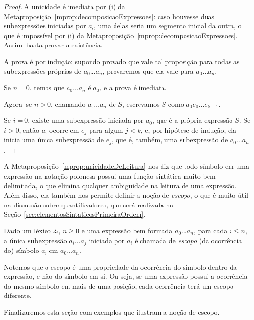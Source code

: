 \begin{proof}

    A unicidade é imediata por (i) da Metaproposição~\ref{mprop:decomposicaoExpressoes}: caso houvesse duas subexpressões iniciadas por $a_i$, uma delas seria um segmento inicial da outra, o que é impossível por (i) da Metaproposição~\ref{mprop:decomposicaoExpressoes}.
    Assim, basta provar a existência.

    A prova é por indução: supondo provado que vale tal proposição para todas as subexpressões próprias de $a_0\dots a_n$, provaremos que ela vale para $a_0\dots a_n$.

    Se $n=0$, temos que $a_0\dots a_n$ é $a_0$, e a prova é imediata.

    Agora, se $n>0$, chamando $a_0\dots a_n$ de $S$, escrevamos $S$ como $a_0e_0\dots e_{k-1}$.

    Se $i=0$, existe uma subexpressão iniciada por $a_0$, que é a própria expressão $S$.
    Se $i>0$, então $a_i$ ocorre em $e_j$ para algum $j<k$, e, por hipótese de indução, ela inicia uma única subexpressão de $e_j$, que é, também, uma subexpressão de $a_0\dots a_n$.
\end{proof}

A Metaproposição~\ref{mprop:unicidadeDeLeitura} nos diz que todo símbolo em uma expressão na notação polonesa possui uma função sintática muito bem delimitada, o que elimina qualquer ambiguidade na leitura de uma expressão.
Além disso, ela também nos permite definir a noção de \emph{escopo}, o que é muito útil na discussão sobre quantificadores, que será realizada na Seção~\ref{sec:elementosSintaticosPrimeiraOrdem}.

\begin{metadefinition}\label{mdef:escopo}
Dado um léxico $\mathcal L$, $n\geq 0$ e uma expressão bem formada $a_0\dots a_n$, para cada $i\leq n$, a única subexpressão $a_i\dots a_j$ iniciada por $a_i$ é chamada de \emph{escopo} (da ocorrência do) símbolo $a_i$ em $a_0\dots a_n$.
\end{metadefinition}

Notemos que o escopo é uma propriedade da ocorrência do símbolo dentro da expressão, e não do símbolo em si.
Ou seja, se uma expressão possui a ocorrência do mesmo símbolo em mais de uma posição, cada ocorrência terá um escopo diferente.

Finalizaremos esta seção com exemplos que ilustram a noção de escopo.


